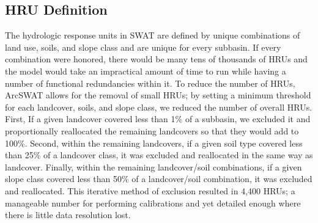 \subsection{HRU Definition}\label{sec:hru_definition}

The hydrologic response units in SWAT are defined by unique combinations of land use, soils, and slope class and are unique for every subbasin. If every combination were honored, there would be many tens of thousands of HRUs and the model would take an impractical amount of time to run while having a number of functional redundancies within it. To reduce the number of HRUs, ArcSWAT allows for the removal of small HRUs; by setting a minimum threshold for each landcover, soils, and slope class, we reduced the number of overall HRUs. First, If a given landcover covered less than 1\% of a subbasin, we excluded it and proportionally reallocated the remaining landcovers so that they would add to 100\%.  Second, within the remaining landcovers, if a given soil type covered less than 25\% of a landcover class, it was excluded and reallocated in the same way as landcover. Finally, within the remaining landcover/soil combinations, if a given slope class covered less than 50\% of a landcover/soil combination, it was excluded and reallocated. This iterative method of exclusion resulted in 4,400 HRUs; a manageable number for performing calibrations and yet detailed enough where there is little data resolution lost. %